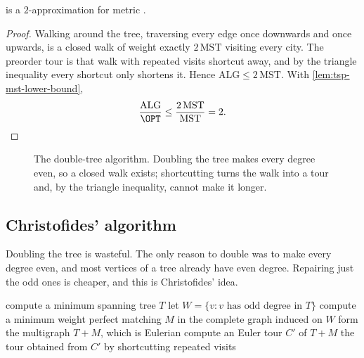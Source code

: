 \begin{theorem}\label{thm:tsp-double-tree}
 is a $2$-approximation for metric .
\end{theorem}

\begin{proof}
Walking around the tree, traversing every edge once downwards and once
upwards, is a closed walk of weight exactly $2\,\mathrm{MST}$ visiting every
city. The preorder tour is that walk with repeated visits shortcut away, and by
the triangle inequality every shortcut only shortens it. Hence
$\mathrm{ALG} \le 2\,\mathrm{MST}$. With \cref{lem:tsp-mst-lower-bound},
\[ \frac{\mathrm{ALG}}{\OPT} \le \frac{2\,\mathrm{MST}}{\mathrm{MST}} = 2. \]
\end{proof}

\begin{figure}[ht]
\centering
{}
\caption{The double-tree algorithm. Doubling the tree makes every degree even,
so a closed walk exists; shortcutting turns the walk into a tour and, by the
triangle inequality, cannot make it longer.}
\label{fig:tsp-double-tree}
\end{figure}

\subsection{Christofides' algorithm}

Doubling the tree is wasteful. The only reason to double was to make every
degree even, and most vertices of a tree already have even degree. Repairing
just the odd ones is cheaper, and this is Christofides' idea.

\begin{algorithm}[ht]
\caption{Christofides' $3/2$-approximation for metric }
\label{alg:christofides}
\begin{algorithmic}[1]
  \State compute a minimum spanning tree $T$
  \State let $W = \{v : v \text{ has odd degree in } T\}$
  \State compute a minimum weight perfect matching $M$ in the complete graph
         induced on $W$
  \State form the multigraph $T + M$, which is Eulerian
  \State compute an Euler tour $C'$ of $T + M$
  \State \Return the tour obtained from $C'$ by shortcutting repeated visits
\end{algorithmic}
\end{algorithm}

